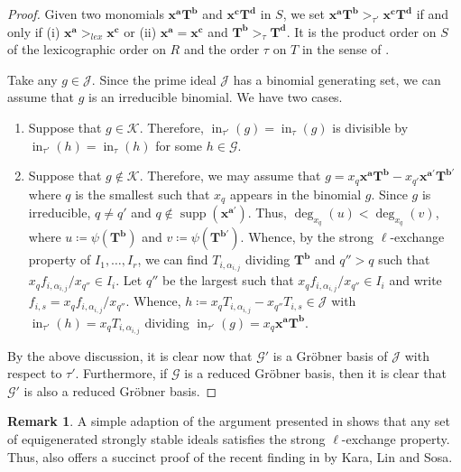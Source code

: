 \documentclass[11pt,a4paper,reqno,dvipsnames]{amsart}
\theoremstyle{plain}
\theoremstyle{definition}
\newtheorem{Assumptions and Discussion}[Theorem]{Assumptions and Discussion}
\newtheorem{Remark}[Theorem]{Remark}
\theoremstyle{remark}
\def\deg{\operatorname{deg}}
\def\ini{\operatorname{in}} %
\def\supp{\operatorname{supp}}
\newcommand\bda{{\bm a}}
\newcommand\bdb{{\bm b}}
\newcommand\bdc{{\bm c}}
\newcommand\bdd{{\bm d}}
\newcommand\bdT{{\bm T}}
\newcommand\bdx{{\bm x}}
\newcommand\calG{\mathcal{G}}
\newcommand\calJ{\mathcal{J}}
\newcommand\calK{\mathcal{K}}
\begin{document}
\begin{proof}
    Given two monomials $\bdx^\bda \bdT^\bdb$ and $\bdx^\bdc \bdT^\bdd$ in $S$, we set $\bdx^\bda \bdT^\bdb >_{\tau'} \bdx^\bdc \bdT^\bdd$ if and only if (i) $\bdx^\bda  >_{lex} \bdx^\bdc$ or (ii) $\bdx^\bda = \bdx^\bdc$ and $\bdT^\bdb >_{\tau} \bdT^\bdd$. It is the product order on $S$ of the lexicographic order on $R$ and the order $\tau$ on $T$ in the sense of \cite[page 17]{EH}.

    Take any $g\in \calJ$. Since the prime ideal $\calJ$ has a binomial generating set, 
    we can assume that $g$ is an irreducible binomial. We have two cases.
    \begin{enumerate}[a]
        \item Suppose that $g\in \calK$. Therefore, $\ini_{\tau'}(g)=\ini_{\tau}(g)$ is divisible by $\ini_{\tau'}(h)=\ini_{\tau}(h)$ for some $h\in \calG$.
        \item Suppose that $g\notin \calK$. Therefore, we may assume that $g=x_q\bdx^{\bda}\bdT^{\bdb} - x_{q'}\bdx^{\bda'}\bdT^{\bdb'}$ where $q$ is the smallest such that $x_q$ appears in the binomial $g$. Since $g$ is irreducible, $q\ne q'$ and $q\notin \supp(\bdx^{\bda'})$. Thus, $\deg_{x_q}(u)<\deg_{x_q}(v)$, where $u\coloneqq \psi(\bdT^{\bdb})$ and $v\coloneqq \psi(\bdT^{\bdb'})$. Whence, by the strong $\ell$-exchange property of $I_1,\dots,I_r$, we can find $T_{i,\alpha_{i,j}}$ dividing $\bdT^{\bdb}$ and $q''>q$ such that $x_qf_{i,\alpha_{i,j}}/x_{q''}\in I_i$. Let $q''$ be the largest such that $x_qf_{i,\alpha_{i,j}}/x_{q''}\in I_i$ and write $f_{i,s}= x_qf_{i,\alpha_{i,j}}/x_{q''}$. Whence, $h\coloneqq x_qT_{i,\alpha_{i,j}}-x_{q''}T_{i,s}\in \calJ$ with $\ini_{\tau'}(h)=x_qT_{i,\alpha_{i,j}}$ dividing $\ini_{\tau'}(g)=x_q\bdx^{\bda}\bdT^{\bdb}$.
    \end{enumerate}
    By the above discussion, it is clear now that $\calG'$ is a Gr\"obner basis of $\calJ$ with respect to $\tau'$. Furthermore, if $\calG$ is a reduced Gr\"obner basis, then it is clear that $\calG'$ is also a reduced Gr\"obner basis.
\end{proof}

\begin{Remark}
    A simple adaption of the argument presented in \cite[Example 4.2]{MR2195995} shows that any set of equigenerated strongly stable ideals satisfies the strong $\ell$-exchange property. Thus,  also offers a succinct proof of the recent finding in \cite[Theorem 3.12]{KLS} by Kara, Lin and Sosa.
\end{Remark}
\end{document}
